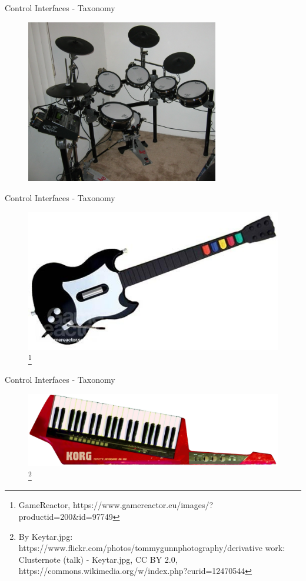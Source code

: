 \documentclass{beamer}
\newcommand\blfootnote[1]{%
  \begingroup
  \renewcommand\thefootnote{}\footnote{#1}%
  \addtocounter{footnote}{-1}%
  \endgroup
}
\begin{document}
\begin{frame}{Control Interfaces - Taxonomy}
    \begin{figure}[h]
        \includegraphics[width=0.75\textwidth]{edrums.jpg}
    \end{figure}
\end{frame}

\begin{frame}{Control Interfaces - Taxonomy}
    \begin{figure}[h]
        \includegraphics[width=\textwidth]{guitarhero.jpg}\blfootnote{GameReactor,  https://www.gamereactor.eu/images/?productid=200\&id=97749}
    \end{figure}
\end{frame}

\begin{frame}{Control Interfaces - Taxonomy}
    \begin{figure}[h]
        \includegraphics[width=\textwidth]{korgrk100.jpg}\blfootnote{By Keytar.jpg: https://www.flickr.com/photos/tommygunnphotography/derivative work: Clusternote (talk) - Keytar.jpg, CC BY 2.0, https://commons.wikimedia.org/w/index.php?curid=12470544}
    \end{figure}
\end{frame}
\end{document}
